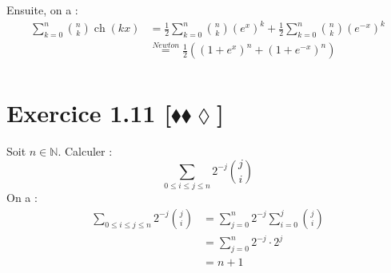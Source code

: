 \documentclass[10pt]{article}
\DeclareMathOperator{\ch}{ch}
\begin{document}
\begin{tcolorbox}[enhanced, width=6in, center, size=fbox, fontupper=\large, drop shadow southwest]
    Ensuite, on a :
    \begin{align*}
        \sum\limits^{n}_{k=0}{\binom{n}{k}\ch(kx)}&=\frac{1}{2}\sum\limits^{n}_{k=0}{\binom{n}{k}(e^x)^k+\frac{1}{2}\sum\limits^{n}_{k=0}{\binom{n}{k}{(e^{-x})^k}}}\\
        &\stackrel{Newton}{=}\frac{1}{2}\left((1+e^x)^n+(1+e^{-x})^n\right)\\
    \end{align*}
\end{tcolorbox}


\section*{Exercice 1.11 [$\blacklozenge\blacklozenge\lozenge$]}
\begin{tcolorbox}[enhanced, width=6in, center, size=fbox, fontupper=\large, drop shadow southwest]
    Soit $n\in\mathbb{N}$. Calculer :
    \begin{equation*}
        \sum\limits_{0\leq{i}\leq{j}\leq{n}}{2^{-j}\binom{j}{i}}
    \end{equation*}
    On a :
    \begin{align*}
        \sum\limits_{0\leq{i}\leq{j}\leq{n}}{2^{-j}\binom{j}{i}}
        &=\sum\limits^{n}_{j=0}{2^{-j}\sum\limits^{j}_{i=0}{\binom{j}{i}}}\\
        &=\sum\limits^{n}_{j=0}{2^{-j}\cdot2^j}\\
        &=n+1
    \end{align*}
\end{tcolorbox}
\end{document}
